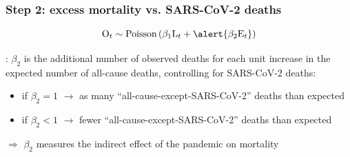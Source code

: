 \documentclass[10pt]{beamer}
\begin{document}
\begin{frame}
	\frametitle{Step 2: excess mortality vs. SARS-CoV-2 deaths}
	$$\text{O}_{t} \sim \text{Poisson}\left( \beta_1\text{L}_{t} + \alert{\beta_2\text{E}_{t}} \right)$$
	\bigskip
	
	\underline{}: $\beta_2$ is the additional number of observed deaths \alert{for each unit increase in the expected number of all-cause deaths}, controlling for SARS-CoV-2 deaths:
	\begin{itemize}
		\item if $\beta_2=1$ $\rightarrow$ as many ``all-cause-except-SARS-CoV-2'' deaths than expected
		\item if $\beta_2<1$ $\rightarrow$ fewer ``all-cause-except-SARS-CoV-2'' deaths than expected
	\end{itemize}
	\bigskip
	
	\alert{$\Rightarrow$} $\beta_2$ measures the \alert{indirect effect} of the pandemic on mortality
	
\end{frame}
%
%
%
%
%
%	
\end{document}
